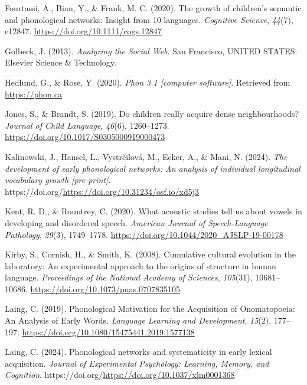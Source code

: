 \documentclass[
  man]{apa6}
\newlength{\cslhangindent}
\newenvironment{CSLReferences}[2] %
 {\begin{list}{}{%
  \setlength{\itemindent}{0pt}
  \setlength{\leftmargin}{0pt}
  \setlength{\parsep}{0pt}
  \ifodd #1
   \setlength{\leftmargin}{\cslhangindent}
   \setlength{\itemindent}{-1\cslhangindent}
  \fi
  \setlength{\itemsep}{#2\baselineskip}}}
 {\end{list}}
\begin{document}
\begin{CSLReferences}{1}{0}
Fourtassi, A., Bian, Y., \& Frank, M. C. (2020). The growth of children's semantic and phonological networks: Insight from 10 languages. \emph{Cognitive Science}, \emph{44}(7), e12847. \url{https://doi.org/10.1111/cogs.12847}

Golbeck, J. (2013). \emph{Analyzing the {Social} {Web}}. San Francisco, UNITED STATES: Elsevier Science \& Technology.

Hedlund, G., \& Rose, Y. (2020). \emph{Phon 3.1 {[}computer software{]}}. Retrieved from \url{https://phon.ca}

Jones, S., \& Brandt, S. (2019). Do children really acquire dense neighbourhoods? \emph{Journal of Child Language}, \emph{46}(6), 1260--1273. \url{https://doi.org/10.1017/S0305000919000473}

Kalinowski, J., Hansel, L., Vystrčilová, M., Ecker, A., \& Mani, N. (2024). \emph{The development of early phonological networks: {An} analysis of individual longitudinal vocabulary growth {[}pre-print{]}}. https://doi.org/\url{https://doi.org/10.31234/osf.io/xd5j3}

Kent, R. D., \& Rountrey, C. (2020). What acoustic studies tell us about vowels in developing and disordered speech. \emph{American Journal of Speech-Language Pathology}, \emph{29}(3), 1749--1778. \url{https://doi.org/10.1044/2020_AJSLP-19-00178}

Kirby, S., Cornish, H., \& Smith, K. (2008). Cumulative cultural evolution in the laboratory: {An} experimental approach to the origins of structure in human language. \emph{Proceedings of the National Academy of Sciences}, \emph{105}(31), 10681--10686. \url{https://doi.org/10.1073/pnas.0707835105}

Laing, C. (2019). Phonological {Motivation} for the {Acquisition} of {Onomatopoeia}: {An} {Analysis} of {Early} {Words}. \emph{Language Learning and Development}, \emph{15}(2), 177--197. \url{https://doi.org/10.1080/15475441.2019.1577138}

Laing, C. (2024). Phonological networks and systematicity in early lexical acquisition. \emph{Journal of Experimental Psychology: Learning, Memory, and Cognition}. https://doi.org/\url{https://doi.org/10.1037/xlm0001368}


\end{CSLReferences}
\end{document}
